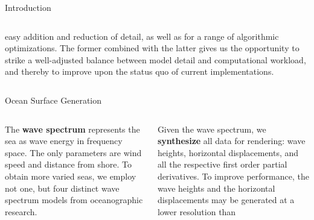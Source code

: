 \documentclass[final,hyperref={pdfpagelabels=true}]{beamer}
\begin{document}
\begin{frame}[fragile]
\begin{center}
\begin{minipage}{\textwidth}
\begin{block}{Introduction}
\begin{columns}[t]
\begin{column}{0.45\linewidth}
					easy addition and reduction of detail, as well as for a range of algorithmic
					optimizations. The former combined with the latter gives us the opportunity to
					strike a well-adjusted balance between model detail and computational workload,
					and thereby to improve upon the status quo of current implementations.
				\end{column}	  
			\end{columns}
		\end{block}
	\end{minipage}
	\begin{minipage}{\textwidth}
		\begin{block}{Ocean Surface Generation}	
			\begin{columns}[t]
				\begin{column}{0.45\linewidth}
					The \textbf{wave spectrum} represents the sea as wave energy in frequency space.
					The only parameters are wind speed and distance from shore.
					To obtain more varied seas, we employ not one, but four distinct wave spectrum models from
					oceanographic research.
					\begin{figure}
					\centering
					\end{figure}
				\end{column}
				\begin{column}{0.45\linewidth}
					Given the wave spectrum, we \textbf{synthesize} all data for rendering:
					wave heights, horizontal displacements, and all the respective first order
					partial derivatives. To improve performance, the wave heights and the
					horizontal displacements may be generated at a lower resolution than

\end{column}
\end{columns}
\end{block}
\end{minipage}
\end{center}
\end{frame}
\end{document}
